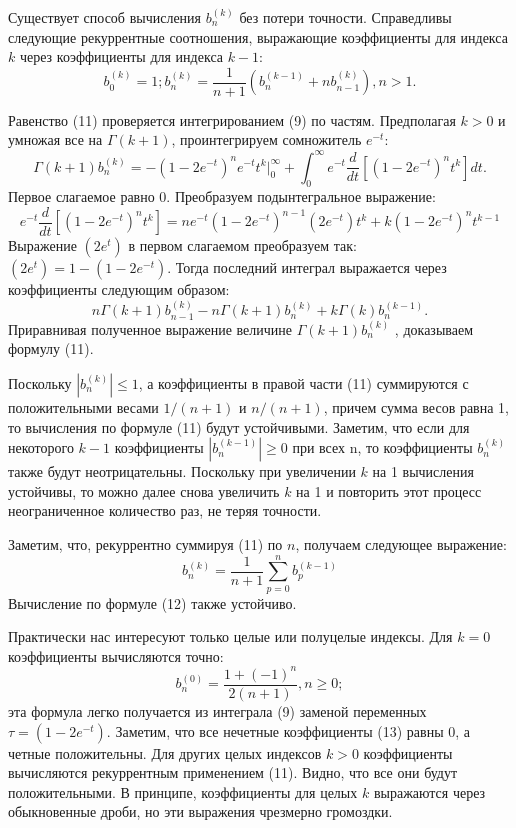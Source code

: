 Существует способ вычисления $b_n^{(k)}$ без потери точности. Справедливы
следующие рекуррентные соотношения, выражающие коэффициенты для
индекса $k$ через коэффициенты для индекса $k-1$:
\begin{equation}
b_0^{(k)}=1;b_n^{(k)}=\frac{1}{n+1}(b_n^{(k-1)}+nb_{n-1}^{(k)}),n>1.
\end{equation}

Равенство (11) проверяется интегрированием (9) по частям. Предполагая
$k > 0$ и умножая все на $\Gamma(k + 1)$, проинтегрируем сомножитель $e^{-t}$:
\begin{equation}
\Gamma(k+1)b_n^{(k)}=-(1-2e^{-t})^ne^{-t}t^k\Big|_0^{\infty} + \int_0^{\infty} e^{-t}\frac{d}{dt}[(1-2e^{-t})^nt^k]dt. 
\end{equation}
Первое слагаемое равно 0. Преобразуем подынтегральное выражение:
\begin{equation}
 e^{-t}\frac{d}{dt}[(1-2e^{-t})^nt^k]=ne^{-t}(1-2e^{-t})^{n-1}(2e^{-t})t^k+k(1-2e^{-t})^nt^{k-1}
\end{equation}
Выражение $(2e^{t})$  в первом слагаемом преобразуем так: $(2e^{t})= 1-(1-2e^{-t})$.
Тогда последний интеграл выражается через коэффициенты следующим
образом:
\begin{equation}
n\Gamma(k+1)b_{n-1}^{(k)}-n\Gamma(k+1)b_n^{(k)}+k\Gamma(k)b_n^{(k-1)}.
\end{equation}
Приравнивая полученное выражение величине $\Gamma{(k+1)}b_n^{(k)}$ , доказываем формулу (11).

Поскольку $|b_n^{(k)}| \leqslant 1$, а коэффициенты в правой части (11) суммируются с
положительными весами $1/(n + 1)$ и $n/(n + 1)$, причем сумма весов равна 1, то
вычисления по формуле (11) будут устойчивыми. Заметим, что если для
некоторого $k - 1$ коэффициенты $|b_n^{(k-1)}| \geqslant 0$ при всех n, то коэффициенты $b_n^{(k)}$ также будут неотрицательны. Поскольку при увеличении $k$ на 1 вычисления
устойчивы, то можно далее снова увеличить $k$ на 1 и повторить этот процесс
неограниченное количество раз, не теряя точности.

Заметим, что, рекуррентно суммируя (11) по $n$, получаем следующее выражение:
\begin{equation}
b_n^{(k)}=\frac{1}{n+1}\sum_{p=0}^n b_p^{(k-1)}
\end{equation}
Вычисление по формуле (12) также устойчиво.

Практически нас интересуют только целые или полуцелые индексы. Для
$k = 0$ коэффициенты вычисляются точно:
\begin{equation}
b_n^{(0)}=\frac{1+(-1)^n}{2(n+1)},n \geqslant 0;
\end{equation}
эта формула легко получается из интеграла (9) заменой переменных
$\tau = (1 - 2e^{-t})$. Заметим, что все нечетные коэффициенты (13) равны 0, а четные
положительны. Для других целых индексов $k > 0$ коэффициенты вычисляются
рекуррентным применением (11). Видно, что все они будут положительными. В
принципе, коэффициенты для целых $k$ выражаются через обыкновенные дроби,
но эти выражения чрезмерно громоздки.


